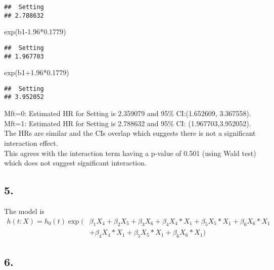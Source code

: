 \documentclass[
]{article}
\newenvironment{Shaded}{\begin{snugshade}}{\end{snugshade}}
\newcommand{\FloatTok}[1]{\textcolor[rgb]{0.00,0.00,0.81}{#1}}
\newcommand{\FunctionTok}[1]{\textcolor[rgb]{0.00,0.00,0.00}{#1}}
\newcommand{\NormalTok}[1]{#1}
\newcommand{\SpecialCharTok}[1]{\textcolor[rgb]{0.00,0.00,0.00}{#1}}
\begin{document}
\begin{verbatim}
##  Setting 
## 2.788632
\end{verbatim}

\begin{Shaded}
\begin{Highlighting}[]
\FunctionTok{exp}\NormalTok{(b1}\FloatTok{{-}1.96}\SpecialCharTok{*}\FloatTok{0.1779}\NormalTok{)}
\end{Highlighting}
\end{Shaded}

\begin{verbatim}
##  Setting 
## 1.967703
\end{verbatim}

\begin{Shaded}
\begin{Highlighting}[]
\FunctionTok{exp}\NormalTok{(b1}\FloatTok{+1.96}\SpecialCharTok{*}\FloatTok{0.1779}\NormalTok{)}
\end{Highlighting}
\end{Shaded}

\begin{verbatim}
##  Setting 
## 3.952052
\end{verbatim}

Mft=0: Estimated HR for Setting is 2.359079 and 95\% CI:(1.652609,
3.367558).\\
Mft=1: Estimated HR for Setting is 2.788632 and 95\% CI:
(1.967703,3.952052).\\
The HRs are similar and the CIs overlap which suggests there is not a
significant interaction effect.\\
This agrees with the interaction term having a p-value of 0.501 (using
Wald test) which does not suggest significant interaction.

\hypertarget{section}{%
\subsection{5.}\label{section}}

The model is \begin{align*}
h(t:X)=h_0(t)\exp(&\beta_1 X_4 +  \beta_2 X_5 + \beta_3 X_6 + \beta_4 X_4*X_1 + \beta_5 X_5*X_1 + \beta_6 X_6*X_1 \\
                  &+\beta_4 X_4*X_1 + \beta_5 X_5*X_1 + \beta_6 X_6*X_1)
\end{align*}

\hypertarget{section-1}{%
\subsection{6.}\label{section-1}}
\end{document}
